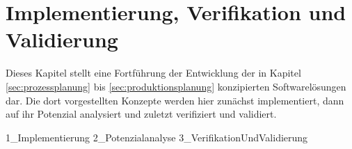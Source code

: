 \chapter{Implementierung, Verifikation und Validierung}
\label{cha:verifikation}

Dieses Kapitel stellt eine Fortführung der Entwicklung der in Kapitel \ref{sec:prozessplanung} bis \ref{sec:produktionsplanung} konzipierten Softwarelösungen dar. Die dort vorgestellten Konzepte werden hier zunächst implementiert, dann auf ihr Potenzial analysiert und zuletzt verifiziert und validiert.

{1_Implementierung}
{2_Potenzialanalyse}
{3_VerifikationUndValidierung}

